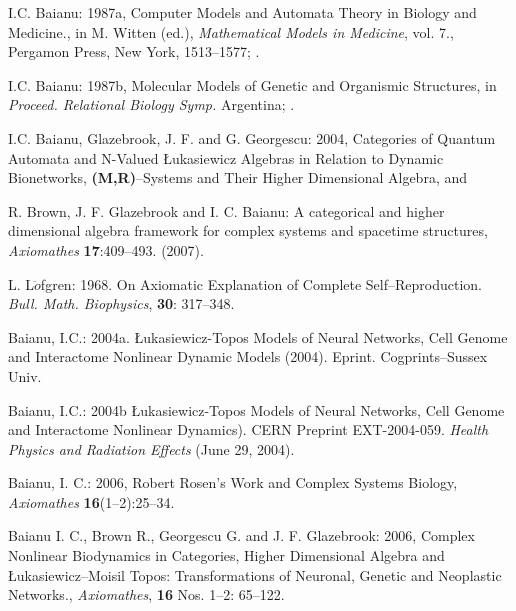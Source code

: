 \documentclass[12pt]{article}
\theoremstyle{plain}
\theoremstyle{definition}
\numberwithin{equation}{section}
\begin{document}
\begin{thebibliography}{9}
I.C. Baianu: 1987a, Computer Models and Automata Theory in Biology and Medicine., in M. Witten (ed.), 
\emph{Mathematical Models in Medicine}, vol. 7., Pergamon Press, New York, 1513--1577; .

I.C. Baianu: 1987b, Molecular Models of Genetic and Organismic Structures, in \emph{Proceed. Relational Biology Symp.} Argentina; .

I.C. Baianu, Glazebrook, J. F. and G. Georgescu: 2004, Categories of Quantum Automata and 
N-Valued \L ukasiewicz Algebras in Relation to Dynamic Bionetworks, \textbf{(M,R)}--Systems and
Their Higher Dimensional Algebra, 
 and 

R. Brown, J. F. Glazebrook and I. C. Baianu: A categorical and higher dimensional algebra framework for complex systems and spacetime structures, \emph{Axiomathes} \textbf{17}:409--493.
(2007).

L. L$\ddot{o}$fgren: 1968. On Axiomatic Explanation of Complete Self--Reproduction. \emph{Bull. Math. Biophysics}, 
\textbf{30}: 317--348. 

Baianu, I.C.: 2004a. \L{}ukasiewicz-Topos Models of Neural Networks, Cell Genome and Interactome Nonlinear Dynamic Models (2004). Eprint. Cogprints--Sussex Univ. 

Baianu, I.C.: 2004b \L{}ukasiewicz-Topos Models of Neural Networks, Cell Genome and Interactome Nonlinear Dynamics). CERN Preprint EXT-2004-059. \textit{Health Physics and Radiation Effects} (June 29, 2004). 
 
Baianu, I. C.: 2006, Robert Rosen's Work and Complex Systems Biology, \emph{Axiomathes} \textbf{16}(1--2):25--34.

Baianu I. C., Brown R., Georgescu G. and J. F. Glazebrook: 2006, Complex Nonlinear Biodynamics in Categories, Higher Dimensional Algebra and \L{}ukasiewicz--Moisil Topos: Transformations of Neuronal, Genetic and Neoplastic Networks., \emph{Axiomathes}, \textbf{16} Nos. 1--2: 65--122.

\end{thebibliography}
\end{document}
